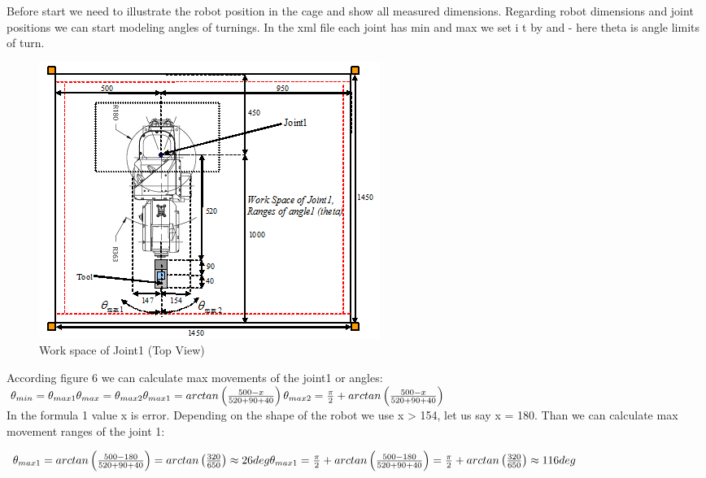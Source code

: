 Before start we need to illustrate the robot position in the cage and show all measured dimensions. Regarding robot dimensions and joint positions we can start modeling angles of turnings. In the xml file each joint has min and max we set i t by  and  - here theta is angle limits of turn. %

\begin{figure}[H]
  \centering
  \includegraphics[scale= 1]{source/JointWorkspaceDimensions.png}
  \caption{Work space of Joint1 (Top View)}
  \label{fig:JointWorkspaceDimensions}
\end{figure}

According figure 6 we can calculate max movements of the joint1 or angles: \\

\noindent$\theta _{min}=\theta _{max1}  \\
\theta _{max}=\theta _{max2}\\
\theta _{max1}=arctan\left ( \frac{500-x}{520+90+40} \right )\\
\theta _{max2}=\frac{\pi }{2}+arctan\left ( \frac{500-x}{520+90+40} \right )$\\

In the formula 1 value x is error. Depending on the shape of the robot we use x > 154, let us say x = 180. Than we can calculate max movement ranges of the joint 1:

\noindent$\theta _{max1}=arctan\left ( \frac{500-180}{520+90+40} \right )=arctan\left ( \frac{320}{650} \right )\approx 26deg \\
\theta _{max1}=\frac{\pi }{2}+arctan\left ( \frac{500-180}{520+90+40} \right )=\frac{\pi }{2}+arctan\left ( \frac{320}{650} \right )\approx 116deg$\\


